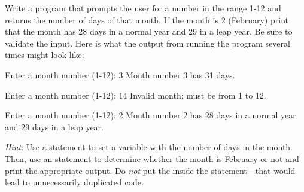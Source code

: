 \begin{exercise}
Write a program that prompts the user for a number in the range 1-12 and returns the number of days of that month. If the month is 2 (February) print that the month has 28 days in a normal year and 29 in a leap year. Be sure to validate the input.  Here is what the output from running the program several times might look like:

\begin{stdout}
Enter a month number (1-12): 3
Month number 3 has 31 days.

Enter a month number (1-12): 14
Invalid month; must be from 1 to 12.

Enter a month number (1-12): 2
Month number 2 has 28 days in a normal year
and 29 days in a leap year.
\end{stdout}

{\em Hint}: Use a  statement to set a variable with the number of days in the month. Then, use an  statement to determine whether the month is February or not and print the appropriate output. Do {\em not} put the  inside the  statement---that would lead to unnecessarily duplicated code.

\end{exercise}

